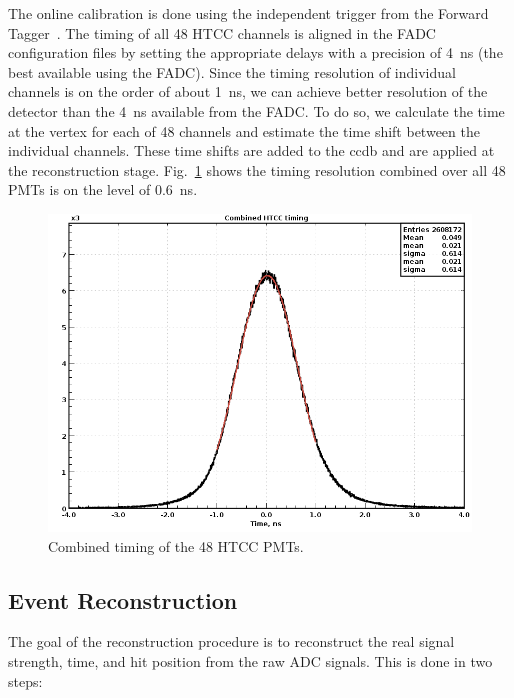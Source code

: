 The online calibration is done using the independent trigger from the Forward Tagger~\cite{ft-nim}. The timing of
all 48 HTCC channels is aligned in the FADC configuration files by setting the appropriate delays with a precision of
4~ns (the best available using the FADC). Since the timing resolution of individual channels is on the order of about
1~ns, we can achieve better resolution of the detector than the 4~ns available from the FADC. To do so, we calculate
the time at the vertex for each of 48 channels and estimate the time shift between the individual channels. These
time shifts are added to the ccdb and are applied at the reconstruction stage.
Fig.~\ref{fig:htcccombinedTimingResponce} shows the timing resolution combined over all 48 PMTs is on the
level of 0.6~ns.

\begin{figure}[ht]
\centering
\includegraphics[width=0.95\linewidth]{images/deltaTime6.png}
\caption{Combined timing of the 48 HTCC PMTs.}
\label{fig:htcccombinedTimingResponce}
\end{figure}

\subsection{Event Reconstruction}

The goal of the reconstruction procedure is to reconstruct the real signal strength, time, and hit position from the
raw ADC signals. This is done in two steps:


